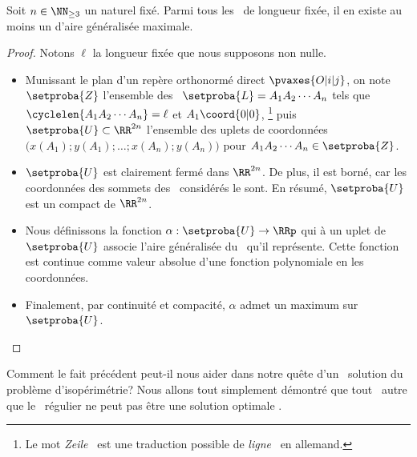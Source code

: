 \begin{fact} \label{suff-cond}
    Soit $n \in \NN_{\geq3}$ un naturel fixé.
    Parmi tous les \ncycles\ de longueur fixée, il en existe au moins un d'aire généralisée maximale.
\end{fact}


\begin{proof}
	Notons $\ell$ la longueur fixée que nous supposons non nulle.
    \begin{itemize}
        \item Munissant le plan d'un repère orthonormé direct $\pvaxes{O | i | j}$, on note $\setproba{Z}$ l'ensemble des \ncycles\ $\setproba{L} = A_1 A_2 \cdots A_n$ tels que
        $\cyclelen{A_1 A_2 \cdots A_n} = \ell$
        et
        $A_1\coord{0 | 0}$,%
        \footnote{
        	Le mot \og \emph{Zeile} \fg\ est une traduction possible de \og \emph{ligne} \fg\ en allemand.
        }
        puis $\setproba{U} \subset \RR^{2n}$ l'ensemble des uplets de coordonnées $\big( x(A_1) ; y(A_1) ; \dots ; x(A_n) ; y(A_n) \big)$ pour $A_1 A_2 \cdots A_n \in \setproba{Z}$.


        \item $\setproba{U}$ est clairement fermé dans $\RR^{2n}$.
        De plus, il est borné, car les coordonnées des sommets des \ncycles\ considérés le sont.
        En résumé, $\setproba{U}$ est un compact de $\RR^{2n}$.


        \item Nous définissons la fonction $\alpha: \setproba{U} \rightarrow \RRp$ qui à un uplet de $\setproba{U}$ associe l'aire généralisée du \ncycle\ qu'il représente.
        Cette fonction est continue comme valeur absolue d'une fonction polynomiale en les coordonnées.


        \item Finalement, par continuité et compacité, $\alpha$ admet un maximum sur $\setproba{U}$.
    \end{itemize}
\end{proof}




Comment le fait précédent peut-il nous aider dans notre quête d'un \ngone\ solution du problème d'isopérimétrie? Nous allons tout simplement démontré que tout \ncycle\ autre que le \ngone\ régulier ne peut pas être une solution \og optimale \fg.
